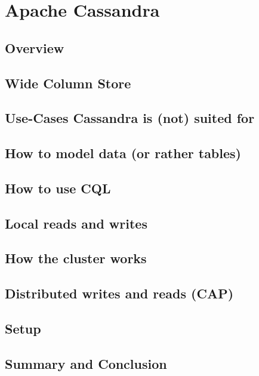 \chapter{Apache Cassandra}

\section{Overview}
\section{Wide Column Store}
\section{Use-Cases Cassandra is (not) suited for}
\section{How to model data (or rather tables)}
\section{How to use CQL}
\section{Local reads and writes}
\section{How the cluster works}
\section{Distributed writes and reads (CAP)}
\section{Setup}
\section{Summary and Conclusion}
